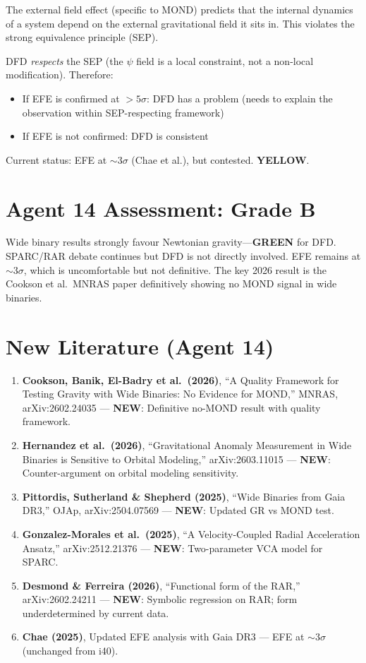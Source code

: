 \documentclass[11pt,a4paper]{article}
\newcommand{\GREEN}{\textcolor{dfdgreen}{\textbf{GREEN}}}
\newcommand{\YELLOW}{\textcolor{dfdyellow}{\textbf{YELLOW}}}
\newcommand{\NEW}{\textcolor{dfdblue}{\textbf{NEW}}}
\begin{document}
The external field effect (specific to MOND) predicts that the internal dynamics of a system depend on the external gravitational field it sits in. This violates the strong equivalence principle (SEP).

DFD \emph{respects} the SEP (the $\psi$ field is a local constraint, not a non-local modification). Therefore:
\begin{itemize}
\item If EFE is confirmed at $> 5\sigma$: DFD has a problem (needs to explain the observation within SEP-respecting framework)
\item If EFE is not confirmed: DFD is consistent
\end{itemize}

Current status: EFE at $\sim 3\sigma$ (Chae et al.), but contested. \YELLOW{}.

\section{Agent 14 Assessment: Grade B}

Wide binary results strongly favour Newtonian gravity---\GREEN{} for DFD. SPARC/RAR debate continues but DFD is not directly involved. EFE remains at $\sim 3\sigma$, which is uncomfortable but not definitive. The key 2026 result is the Cookson et al.\ MNRAS paper definitively showing no MOND signal in wide binaries.

\section{New Literature (Agent 14)}

\begin{enumerate}
\item \textbf{Cookson, Banik, El-Badry et al.\ (2026)}, ``A Quality Framework for Testing Gravity with Wide Binaries: No Evidence for MOND,'' MNRAS, arXiv:2602.24035 --- \NEW: Definitive no-MOND result with quality framework.

\item \textbf{Hernandez et al.\ (2026)}, ``Gravitational Anomaly Measurement in Wide Binaries is Sensitive to Orbital Modeling,'' arXiv:2603.11015 --- \NEW: Counter-argument on orbital modeling sensitivity.

\item \textbf{Pittordis, Sutherland \& Shepherd (2025)}, ``Wide Binaries from Gaia DR3,'' OJAp, arXiv:2504.07569 --- \NEW: Updated GR vs MOND test.

\item \textbf{Gonzalez-Morales et al.\ (2025)}, ``A Velocity-Coupled Radial Acceleration Ansatz,'' arXiv:2512.21376 --- \NEW: Two-parameter VCA model for SPARC.

\item \textbf{Desmond \& Ferreira (2026)}, ``Functional form of the RAR,'' arXiv:2602.24211 --- \NEW: Symbolic regression on RAR; form underdetermined by current data.

\item \textbf{Chae (2025)}, Updated EFE analysis with Gaia DR3 --- EFE at $\sim 3\sigma$ (unchanged from i40).
\end{enumerate}
\end{document}
